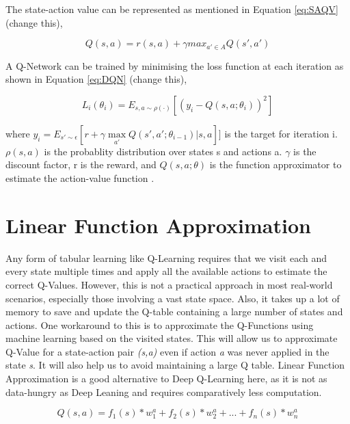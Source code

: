 \documentclass[logo,msc]{infthesis}           %
\begin{document}
 The state-action value can be represented as mentioned in Equation \ref{eq:SAQV} (change this),

\begin{equation}
Q(s,a) = r(s,a) + {\gamma} max_{a'\in A} Q(s',a')
\label{eq:SAQV}
\end{equation}
 
 A Q-Network can be trained by minimising the loss function at each iteration as shown in Equation \ref{eq:DQN} (change this),

\begin{equation} L_{i}(\theta _{i}) = E_{s,a\sim\rho(\cdot)}[(y_{i} - Q(s,a;\theta _{i}))^2]
\label{eq:DQN}
\end{equation}

where \(y_{i} = E_{s'\sim\epsilon}[r+\gamma\max\limits_{{a'}}Q(s', a'; \theta_{i-1})|s, a]]\) is the target for iteration i. \(\rho(s,a)\) is the probablity distribution over states s and actions a. \(\gamma\) is the discount factor, r is the reward, and \(Q(s,a;\theta)\) is the function approximator to estimate the action-value function \cite{DBLP:journals/corr/MnihKSGAWR13}.

\section{Linear Function Approximation}

Any form of tabular learning like Q-Learning requires that we visit each and every state multiple times and apply all the available actions to estimate the correct Q-Values. However, this is not a practical approach in most real-world scenarios, especially those involving a vast state space. Also, it takes up a lot of memory to save and update the Q-table containing a large number of states and actions. One workaround to this is to approximate the Q-Functions using machine learning based on the visited states. This will allow us to approximate Q-Value for a state-action pair \textit{(s,a)} even if action \textit{a} was never applied in the state \textit{s}. It will also help us to avoid maintaining a large Q table. Linear Function Approximation \cite{P2} is a good alternative to Deep Q-Learning here, as it is not as data-hungry as Deep Leaning and requires comparatively less computation.

\begin{equation}
Q(s,a) = f_1(s) * w_1^a + f_2(s) * w_2^a + ... + f_n(s) * w_n^a 
\label{eq:Q_Approx}
\end{equation}
\end{document}
